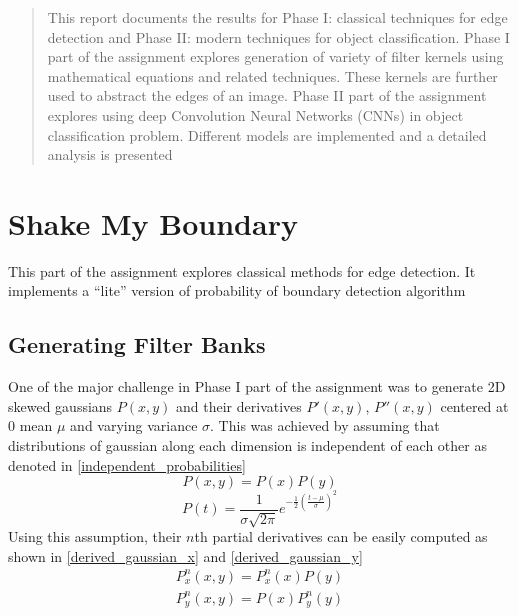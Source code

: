 \documentclass[conference]{IEEEtran}
\begin{document}
		\begin{abstract}
			This report documents the results for Phase I: classical techniques for edge detection and Phase II: modern techniques for object classification. Phase I part of the assignment explores generation of variety of filter kernels using mathematical equations and related techniques. These kernels are further used to abstract the edges of an image. Phase II part of the assignment explores using deep Convolution Neural Networks (CNNs) in object classification problem. Different models are implemented and a detailed analysis is presented 
		\end{abstract}
		
		
		
		
		
		
		
		\section{Shake My Boundary}
		This part of the assignment explores classical methods for edge detection. It implements a ``lite'' version of probability of boundary detection algorithm

		
		
		\subsection{Generating Filter Banks}
		One of the major challenge in Phase I part of the assignment was to generate 2D skewed gaussians $P(x,y)$ and their derivatives $P'(x,y)$, $P''(x,y)$ centered at 0 mean $\mu$ and varying variance $\sigma$. This was achieved by assuming that distributions of gaussian along each dimension is independent of each other as denoted in \ref{independent_probabilities}
		\begin{equation}
			\label{independent_probabilities}
			P(x,y) = P(x)P(y)
		\end{equation}
		\begin{equation}
			\label{gaussian_distribution}
			P(t) = \frac{1}{\sigma\sqrt{2\pi}}e^{-\frac{1}{2}\left(\frac{t-\mu}{\sigma}\right)^2} 
		\end{equation}
		Using this assumption, their $n$th partial derivatives can be easily computed as shown in \ref{derived_gaussian_x} and \ref{derived_gaussian_y}
		\begin{eqnarray}
			\label{derived_gaussian_x}
			P_x^n(x,y) = P_x^n(x)P(y)\\
			\label{derived_gaussian_y}
			P_y^n(x,y) = P(x)P_y^n(y)
		\end{eqnarray}
		
\end{document}
